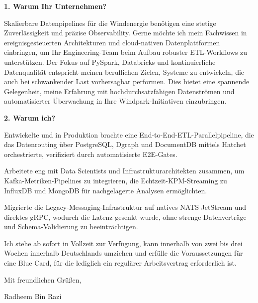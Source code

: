 \documentclass[11pt,a4paper]{coverletter}
\begin{document}
\vspace{8pt}\noindent\textbf{1. Warum Ihr Unternehmen?}\par\vspace{3pt}

Skalierbare Datenpipelines für die Windenergie benötigen eine stetige Zuverlässigkeit und präzise Observability. Gerne möchte ich mein Fachwissen in ereignisgesteuerten Architekturen und cloud-nativen Datenplattformen einbringen, um Ihr Engineering-Team beim Aufbau robuster ETL-Workflows zu unterstützen. Der Fokus auf PySpark, Databricks und kontinuierliche Datenqualität entspricht meinen beruflichen Zielen, Systeme zu entwickeln, die auch bei schwankender Last vorhersagbar performen. Dies bietet eine spannende Gelegenheit, meine Erfahrung mit hochdurchsatzfähigen Datenströmen und automatisierter Überwachung in Ihre Windpark-Initiativen einzubringen.

\vspace{8pt}\noindent\textbf{2. Warum ich?}\par\vspace{3pt}

\bullets

  \item Entwickelte und in Produktion brachte eine End-to-End-ETL-Parallelpipeline, die das Datenrouting über PostgreSQL, Dgraph und DocumentDB mittels Hatchet orchestrierte, verifiziert durch automatisierte E2E-Gates.

  \item Arbeitete eng mit Data Scientists und Infrastrukturarchitekten zusammen, um Kafka-Metriken-Pipelines zu integrieren, die Echtzeit-KPM-Streaming zu InfluxDB und MongoDB für nachgelagerte Analysen ermöglichten.

  \item Migrierte die Legacy-Messaging-Infrastruktur auf natives NATS JetStream und direktes gRPC, wodurch die Latenz gesenkt wurde, ohne strenge Datenverträge und Schema-Validierung zu beeinträchtigen.

\bulletsend

Ich stehe ab sofort in Vollzeit zur Verfügung, kann innerhalb von zwei bis drei Wochen innerhalb Deutschlands umziehen und erfülle die Voraussetzungen für eine Blue Card, für die lediglich ein regulärer Arbeitsvertrag erforderlich ist.

\closing{Mit freundlichen Grüßen,}{Radheem Bin Razi}
\end{document}
